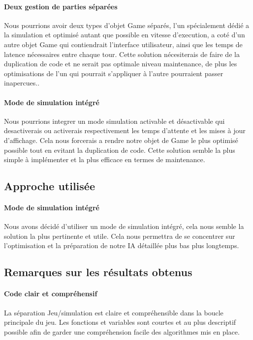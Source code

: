 \documentclass{scratcl}
\begin{document}
    \paragraph{Deux gestion de parties séparées}
    Nous pourrions avoir deux types d'objet Game séparés, l'un
    spécialement dédié a la simulation et optimisé autant que possible en
    vitesse d'execution, a coté d'un autre objet Game qui contiendrait
    l'interface utilisateur, ainsi que les temps de latence nécessaires entre
    chaque tour.
    Cette solution nécesiterais de faire de la duplication de
    code et ne serait pas optimale niveau maintenance, de plus les
    optimisations de l'un qui pourrait s'appliquer à l'autre pourraient
    passer inapercues..

    \paragraph{Mode de simulation intégré}
    Nous pourrions integrer un mode simulation activable et désactivable qui
    desactiverais ou activerais respectivement les temps d'attente et les
    mises à jour d'affichage.
    Cela nous forcerais a rendre notre objet de Game le plus optimisé
    possible tout en evitant la duplication de code.
    Cette solution semble la plus simple à implémenter et la plus efficace en
    termes de maintenance.

    \subsection{Approche utilisée}
    \paragraph{Mode de simulation intégré}
    Nous avons décidé d'utiliser un mode de simulation intégré, cela nous
    semble la solution la plus pertinente et utile.
    Cela nous permettra de se concentrer sur l'optimisation et la préparation
    de notre IA détaillée plus bas plus longtemps.

    \subsection{Remarques sur les résultats obtenus}

    \paragraph{Code clair et compréhensif}
    La séparation Jeu/simulation est claire et compréhensible dans la boucle
    principale du jeu.
    Les fonctions et variables sont courtes et au plus descriptif possible
    afin de garder une compréhension facile des algorithmes mis en place.
\end{document}
